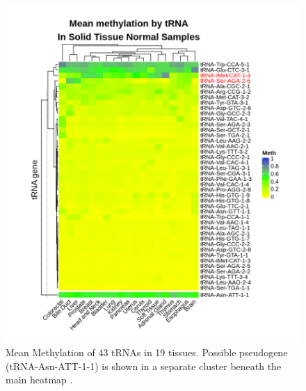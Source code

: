 \documentclass[]{book}
\begin{document}
\begin{figure}

{\centering \includegraphics[width=0.9\linewidth]{./figs/meanBetasByTissueTNMpseudoSplitHeatmap} 

}

\caption{Mean Methylation of 43 tRNAs in 19 tissues. Possible pseudogene (tRNA-Asn-ATT-1-1) is shown in a separate cluster beneath the main heatmap \citep{Gu2016}.}\label{fig:meanBetasByTissueTNMHeatmap}
\end{figure}
\end{document}
